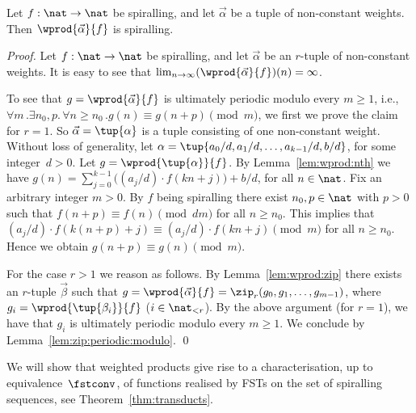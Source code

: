 \begin{lemma}\label{lem:wprod:preserve:spiralling}
  Let $f:\nat\to\nat$ be spiralling, and let $\vec{\alpha}$ be a tuple of non-constant weights.
  Then $\wprod{\vec{\alpha}}{f}$ is spiralling.
\end{lemma}
\begin{proof}Let $f:\nat\to\nat$ be spiralling, and let $\vec{\alpha}$ be an $r$-tuple of non-constant weights.
  It is easy to see that 
  $\lim_{n \to \infty}(\wprod{\vec{\alpha}}{f})(n) = \infty$.

  To see that $g = \wprod{\vec{\alpha}}{f}$ is ultimately periodic modulo every $m \ge 1$,
  i.e., $\forall m\,.\exists n_0,p.\,\forall n \ge n_0\,. g(n) \equiv g(n+p) \pmod{m}$,
  we first we prove the claim for $r = 1$. 
  So $\vec{\alpha} = \tup{\alpha}$ is a tuple consisting of one non-constant weight.
  Without loss of generality, let $\alpha = \tup{a_0/d,a_1/d,\ldots,a_{k-1}/d,b/d}$, for some integer~$d > 0$.
  Let $g = \wprod{\tup{\alpha}}{f}$. 
  By Lemma~\ref{lem:wprod:nth} we have
  $g(n) = \sum_{j=0}^{k-1} \big((a_j/d) \cdot f(kn+j)\big) + b/d$, for all $n \in \nat$.
  Fix an arbitrary integer $m > 0$.
  By $f$ being spiralling there exist
  $n_0,p\in\nat$ with $p > 0$
  such that $f(n+p) \equiv f(n) \pmod{dm}$ for all $n \ge n_0$.
This implies that $(a_j/d) \cdot f(k(n+p)+j) \equiv (a_j/d) \cdot f(kn+j) \pmod{m}$ for all $n \ge n_0$.
  Hence we obtain $g(n+p) \equiv g(n) \pmod{m}$.

  For the case $r > 1$ we reason as follows.
  By Lemma~\ref{lem:wprod:zip} there exists an $r$-tuple $\vec{\beta}$ such that 
  $g = \wprod{\vec{\alpha}}{f} = \zip_r(g_0,g_1,\ldots,g_{m-1})$,
  where $g_i = \wprod{\tup{\beta_i}}{f}$ ($i \in \nat_{<r}$).
  By the above argument (for $r = 1$), 
  we have that $g_i$ is ultimately periodic modulo every $m \ge 1$.
  We conclude by Lemma~\ref{lem:zip:periodic:modulo}.
  \qed
\end{proof}

We will show that weighted products give rise to a characterisation, up to equivalence~$\fstconv$, 
of functions realised by FSTs on the set of spiralling sequences, see Theorem~\ref{thm:transducts}.


